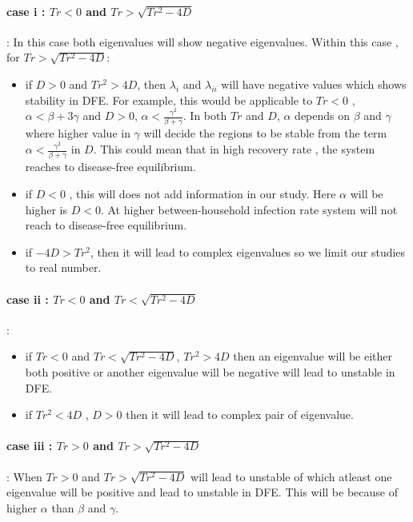 \documentclass[paper=a4, fontsize=11pt, twoside, BCOR=12mm, parskip=full, listof=totoc]{scrreprt}
\begin{document}
{\paragraph*{\textbf{case i : $ Tr < 0$ and $Tr > \sqrt{Tr^2-4D}$ }}:
In this case both eigenvalues  will show negative eigenvalues.
Within this case , for $Tr > \sqrt{Tr^2 - 4D}$: 
\begin{itemize}
\item if $D > 0$ and $Tr^2 > 4D$, then $ \lambda_{i} $ and $ \lambda_{ii} $ will have negative values which shows stability in DFE. For example, this would be applicable to $ Tr < 0 $ , \( \alpha < \beta + 3\gamma \) and $ D > 0 $, \( \alpha < \frac{\gamma^2}{\beta + \gamma} \). In both $Tr$ and $D$, $\alpha$ depends on $\beta$ and $\gamma$ where higher value in $\gamma$ will decide the regions to be stable from the term \( \alpha < \frac{\gamma^2}{\beta + \gamma} \) in $ D $. This could mean that in high recovery rate , the system reaches to disease-free equilibrium.
\item if $ D < 0 $ , this will does not add information in our study. Here $\alpha$ will be higher is $ D < 0 $. At higher between-household infection rate system will not reach to disease-free equilibrium. 
\item if $-4D > Tr^2$, then it will lead to complex eigenvalues so we limit our studies to real number. 
\end{itemize}

\paragraph*{\textbf{case ii : $ Tr < 0 $ and $Tr < \sqrt{Tr^2-4D} $ }}:
\begin{itemize}
\item  if $Tr < 0$ and $Tr < \sqrt{Tr^2 - 4D}$,  $Tr^2 > 4D$ then an eigenvalue will be either both positive or another eigenvalue will be negative will lead to unstable in DFE. 
\item  if $Tr^2 < 4D$ , $D > 0$ then it will lead to complex pair of eigenvalue.      
\end{itemize}

\paragraph*{\textbf{case iii : $ Tr > 0 $ and $Tr > \sqrt{Tr^2-4D} $ }}:
When $Tr > 0$ and $Tr > \sqrt{Tr^2 - 4D}$ will lead to unstable of which atleast one eigenvalue will be positive and lead to unstable in DFE. This will be because of higher $\alpha$ than $\beta$ and $\gamma$.  

}
\end{document}
